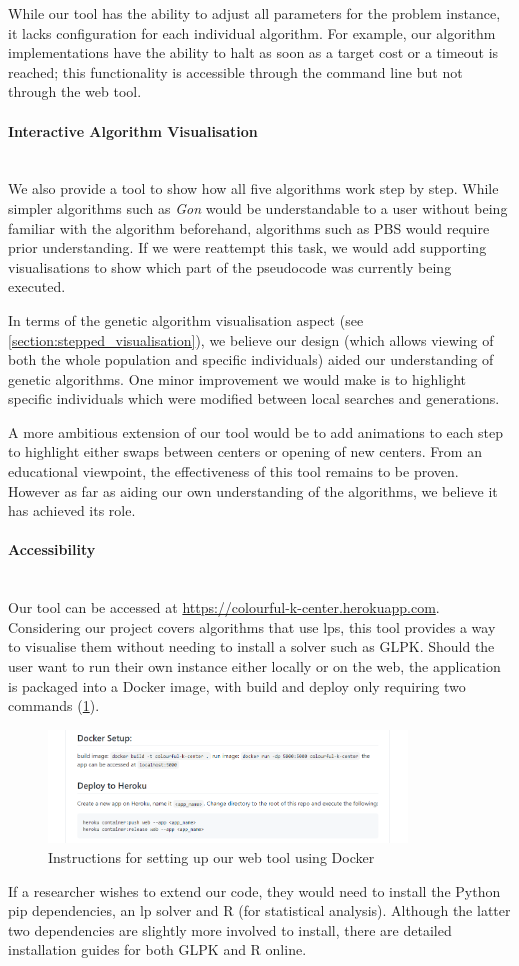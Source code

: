 While our tool has the ability to adjust all parameters for the problem instance, it lacks configuration for each individual algorithm. For example, our algorithm implementations have the ability to halt as soon as a target cost or a timeout is reached; this functionality is accessible through the command line but not through the web tool.

\paragraph{Interactive Algorithm Visualisation}~\\
We also provide a tool to show how all five algorithms work step by step. While simpler algorithms such as \emph{Gon} would be understandable to a user without being familiar with the algorithm beforehand, algorithms such as PBS would require prior understanding. If we were reattempt this task, we would add supporting visualisations to show which part of the pseudocode was currently being executed. 

In terms of the genetic algorithm visualisation aspect (see \cref{section:stepped_visualisation}), we believe our design (which allows viewing of both the whole population and specific individuals) aided our understanding of genetic algorithms. One minor improvement we would make is to highlight specific individuals which were modified between local searches and generations.

A more ambitious extension of our tool would be to add animations to each step to highlight either swaps between centers or opening of new centers. From an educational viewpoint, the effectiveness of this tool remains to be proven. However as far as aiding our own understanding of the algorithms, we believe it has achieved its role.

\paragraph{Accessibility}~\\
Our tool can be accessed at \url{https://colourful-k-center.herokuapp.com}. Considering our project covers algorithms that use \acrshort{lp}s, this tool provides a way to visualise them without needing to install a solver such as GLPK. Should the user want to run their own instance either locally or on the web, the application is packaged into a Docker image, with build and deploy only requiring two commands (\cref{fig:docker_setup}).

\begin{figure}[H]
    \centering
    \includegraphics[width=0.85\textwidth]{images/docker_setup.png}
    \caption{Instructions for setting up our web tool using Docker}
    \label{fig:docker_setup}
\end{figure}

If a researcher wishes to extend our code, they would need to install the Python pip dependencies, an \acrshort{lp} solver and R (for statistical analysis). Although the latter two dependencies are slightly more involved to install, there are detailed installation guides for both GLPK and R online.